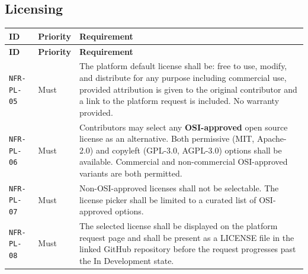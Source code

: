 \documentclass[12pt,a4paper]{article}
\begin{document}
\subsection{Licensing}
\begin{longtable}{L{2.2cm} L{1.8cm} L{9.3cm}}
  \color{white}\bfseries ID & \color{white}\bfseries Priority & \color{white}\bfseries Requirement \\
  \endfirsthead
  \color{white}\bfseries ID & \color{white}\bfseries Priority & \color{white}\bfseries Requirement \\
  \endhead\hline
  \texttt{NFR-PL-05} & Must   & The platform default license shall be: free to use, modify, and distribute for any purpose including commercial use, provided attribution is given to the original contributor and a link to the platform request is included. No warranty provided. \\
  \texttt{NFR-PL-06} & Must   & Contributors may select any \textbf{OSI-approved} open source license as an alternative. Both permissive (MIT, Apache-2.0) and copyleft (GPL-3.0, AGPL-3.0) options shall be available. Commercial and non-commercial OSI-approved variants are both permitted. \\
  \texttt{NFR-PL-07} & Must   & Non-OSI-approved licenses shall not be selectable. The license picker shall be limited to a curated list of OSI-approved options. \\
  \texttt{NFR-PL-08} & Must   & The selected license shall be displayed on the platform request page and shall be present as a LICENSE file in the linked GitHub repository before the request progresses past the In Development state. \\
  \hline
\end{longtable}
\end{document}
